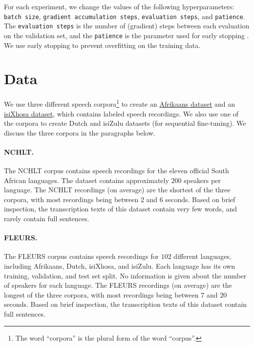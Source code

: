 \newpage

For each experiment, we change the values of the following hyperparameters: 
\texttt{batch size}, \texttt{gradient accumulation steps}, \texttt{evaluation steps}, and \texttt{patience}.
The \texttt{evaluation steps} is the number of (gradient) steps between each evaluation on the validation set,
and the \texttt{patience} is the parameter used for early stopping \cite{wikipedia2023early_stopping}. 
We use early stopping to prevent overfitting on the training data.

\section{Data}
We use three different speech corpora\footnote{The word ``corpora'' is the plural form of the word ``corpus''.}
to create an \href{https://huggingface.co/datasets/lucas-meyer/asr_af}{Afrikaans dataset} 
and an \href{https://huggingface.co/datasets/lucas-meyer/asr_xh}{isiXhosa dataset}, which contains labeled speech recordings.
We also use one of the corpora to create Dutch and isiZulu datasets (for sequential fine-tuning).
We discuss the three corpora in the paragraphs below.

\paragraph*{NCHLT.}
The NCHLT \cite{barnard2014nchlt} corpus contains speech recordings for the eleven official South African languages.
The dataset contains approximately $200$ speakers per language.
The NCHLT recordings (on average) are the shortest of the three corpora, with most recordings being between $2$ and $6$ seconds.
Based on brief inspection, the transcription texts of this dataset contain very few words, and rarely contain full sentences.

\paragraph*{FLEURS.}
The FLEURS \cite{fleurs2022arxiv} corpus contains speech recordings for $102$ different languages, including Afrikaans, Dutch, isiXhosa, and isiZulu.
Each language has its own training, validation, and test set split.
No information is given about the number of speakers for each language.
The FLEURS recordings (on average) are the longest of the three corpora, with most recordings being between $7$ and $20$ seconds.
Based on brief inspection, the transcription texts of this dataset contain full sentences.

